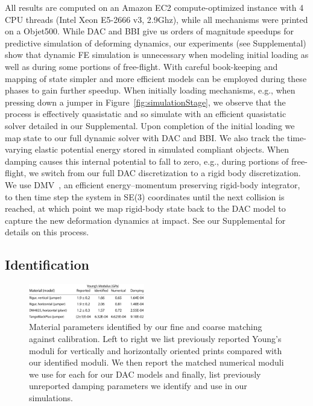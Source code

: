 All results are computed on an Amazon EC2 compute-optimized instance with 4 CPU threads (Intel Xeon E5-2666 v3, 2.9Ghz), while all mechanisms were printed on a Objet500.
While DAC and BBI give us orders of magnitude speedups for predictive simulation of deforming dynamics, our experiments (see Supplemental) show that dynamic FE simulation is unnecessary when modeling initial loading as well as during some portions of free-flight. With careful book-keeping and mapping of state simpler and more efficient models can be employed during these phases to gain further speedup.
When initially loading mechanisms, e.g., when pressing down a jumper in Figure~\ref{fig:simulationStage}, we observe that the process is effectively quasistatic and so simulate with an efficient quasistatic solver detailed in our Supplemental. Upon completion of the initial loading we map state to our full dynamic solver with DAC and BBI.
We also track the time-varying elastic potential energy stored in simulated compliant objects. When damping causes this internal potential to fall to zero, e.g., during portions of free-flight, we switch from our full DAC discretization to a rigid body discretization. We use DMV~\cite{Moser:1991dl}, an efficient energy--momentum preserving rigid-body integrator, to then time step the system in SE(3) coordinates until the next collision is reached, at which point we map rigid-body state back to the DAC model to capture the new deformation dynamics at impact. See our Supplemental for details on this process.

\subsection{Identification}

\begin{figure}[h!]
\centering
\includegraphics[width=0.45\textwidth]{figs/materials_table}
\caption{Material parameters identified by our fine and coarse matching against calibration. Left to right we list previously reported Young's moduli for vertically and horizontally oriented prints compared with our identified moduli. We then report the matched numerical moduli we use for each for our DAC models and finally, list previously unreported damping parameters we identify and use in our simulations. 
}
\label{fig:identified_params}
\end{figure}

